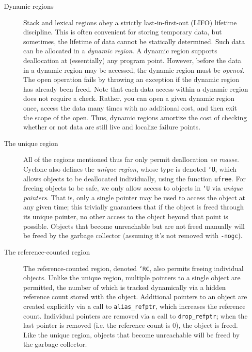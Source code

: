 \begin{description}
\item[Dynamic regions]  Stack and lexical regions obey a strictly
  last-in-first-out (LIFO) lifetime discipline.  This is often
  convenient for storing temporary data, but sometimes, the lifetime
  of data cannot be statically determined.  Such data can be allocated
  in a \emph{dynamic region}.  A dynamic region supports deallocation
  at (essentially) any program point.  However, before the data in a
  dynamic region may be accessed, the dynamic region must be \emph{opened}.
  The open operation fails by throwing an exception if the dynamic
  region has already been freed.  Note that each data access within
  a dynamic region does not require a check.  Rather, you can open
  a given dynamic region once, access the data many times with no
  additional cost, and then exit the scope of the open.  Thus, 
  dynamic regions amortize the cost of checking whether or not data
  are still live and localize failure points.  

\item[The unique region] All of the regions mentioned thus far only permit
  deallocation \emph{en masse.}  Cyclone also defines the \emph{unique
  region}, whose type is denoted \texttt{`U}, which allows objects to be
  deallocated individually, using the function \texttt{ufree}.  For freeing
  objects to be safe, we only allow access to objects in \texttt{`U} via
  \emph{unique pointers}.  That is, only a single pointer may be used to
  access the object at any given time; this trivially guarantees that if the
  object is freed through its unique pointer, no other access to the object
  beyond that point is possible.  Objects that become unreachable but are
  not freed manually will be freed by the garbage collector (assuming it's
  not removed with \texttt{-nogc}).

\item[The reference-counted region] The reference-counted region, denoted
  \texttt{`RC}, also permits freeing individual objects.  Unlike the unique
  region, multiple pointers to a single object are permitted, the number of
  which is tracked dynamically via a hidden reference count stored with the
  object.  Additional pointers to an object are created explicitly via a
  call to \texttt{alias\_refptr}, which increases the reference count.
  Individual pointers are removed via a call to \texttt{drop\_refptr}; when
  the last pointer is removed (i.e. the reference count is 0), the object is
  freed.  Like the unique region, objects that become unreachable will be
  freed by the garbage collector.
\end{description}

